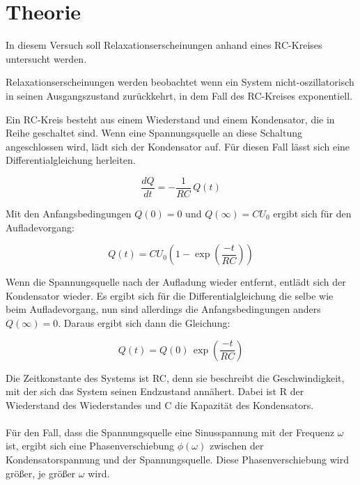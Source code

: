 \section{Theorie}

In diesem Versuch soll Relaxationserscheinungen anhand eines RC-Kreises untersucht
werden.

Relaxationserscheinungen werden beobachtet wenn ein System nicht-oszillatorisch
in seinen Ausgangszustand zurückkehrt, in dem Fall des RC-Kreises exponentiell.

Ein RC-Kreis besteht aus einem Wiederstand und einem Kondensator, die in Reihe
geschaltet sind. Wenn eine Spannungsquelle an diese Schaltung angeschlossen wird,
lädt sich der Kondensator auf. Für diesen Fall lässt sich eine Differentialgleichung
herleiten.

\begin{equation}
  \frac{dQ}{dt} = -\frac{1}{RC}\, Q(t)
\end{equation}

Mit den Anfangsbedingungen $Q(0)=0$ und $Q(\infty)= CU_0$ ergibt sich für den Aufladevorgang:

\begin{equation}
  Q(t) = CU_0 \left(1 - \exp\left(\frac{-t}{RC}\right)\right)
\end{equation}

Wenn die Spannungsquelle nach der Aufladung wieder entfernt, entlädt sich der Kondensator
wieder. Es ergibt sich für die Differentialgleichung die selbe wie beim Aufladevorgang,
nun sind allerdings die Anfangsbedingungen anders $Q(\infty) = 0$. Daraus ergibt sich dann
die Gleichung:

\begin{equation}
  Q(t) = Q(0)\, \exp\left(\frac{-t}{RC}\right)
\end{equation}

Die Zeitkonstante des Systems ist RC, denn sie beschreibt die Geschwindigkeit, mit
der sich das System seinen Endzustand annähert. Dabei ist R der Wiederstand des Wiederstandes
und C die Kapazität des Kondensators.\\\\

Für den Fall, dass die Spannungsquelle eine Sinusspannung mit der Frequenz $\omega$
ist, ergibt sich eine Phasenverschiebung $\phi(\omega)$ zwischen der Kondensatorspannung
und der Spannungsquelle. Diese Phasenverschiebung wird größer, je größer $\omega$ wird.

